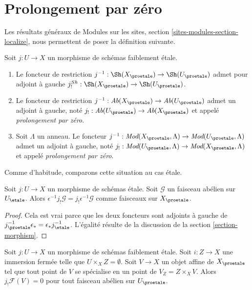 \section{Prolongement par zéro}
\label{section-extension-by-zero}

\noindent
Les résultats généraux de
Modules sur les sites, section \ref{sites-modules-section-localize},
nous permettent de poser la définition suivante.

\begin{definition}
\label{definition-extension-zero}
Soit $j : U \to X$ un morphisme de schémas faiblement \'etale.
\begin{enumerate}
\item Le foncteur de restriction
$j^{-1} : \Sh(X_\proetale) \to \Sh(U_\proetale)$
admet pour adjoint à gauche
$j_!^{Sh} : \Sh(X_\proetale) \to \Sh(U_\proetale)$.
\item Le foncteur de restriction
$j^{-1} : \textit{Ab}(X_\proetale) \to \textit{Ab}(U_\proetale)$
admet un adjoint à gauche, noté
$j_! : \textit{Ab}(U_\proetale) \to \textit{Ab}(X_\proetale)$
et appelé {\it prolongement par zéro}.
\item Soit $\Lambda$ un anneau. Le foncteur
$j^{-1} : \textit{Mod}(X_\proetale, \Lambda) \to
\textit{Mod}(U_\proetale, \Lambda)$
admet un adjoint à gauche, noté
$j_! : \textit{Mod}(U_\proetale, \Lambda) \to
\textit{Mod}(X_\proetale, \Lambda)$
et appelé {\it prolongement par zéro}.
\end{enumerate}
\end{definition}

\noindent
Comme d'habitude, comparons cette situation au cas \'etale.

\begin{lemma}
\label{lemma-jshriek-comparison}
Soit $j : U \to X$ un morphisme de schémas \'etale.
Soit $\mathcal{G}$ un faisceau abélien sur $U_\etale$.
Alors $\epsilon^{-1} j_!\mathcal{G} = j_!\epsilon^{-1}\mathcal{G}$
comme faisceaux sur $X_\proetale$.
\end{lemma}

\begin{proof}
Cela est vrai parce que les deux foncteurs sont adjoints à gauche de
$j_\proetale^{-1} \epsilon_* = \epsilon_* j_\etale^{-1}$.
L'égalité résulte de la discussion de la section \ref{section-morphism}.
\end{proof}

\begin{lemma}
\label{lemma-jshriek-zero}
Soit $j : U \to X$ un morphisme de schémas faiblement \'etale.
Soit $i : Z \to X$ une immersion fermée telle que $U \times_X Z = \emptyset$.
Soit $V \to X$ un objet affine de $X_\proetale$ tel que tout point
de $V$ se spécialise en un point de $V_Z = Z \times_X V$.
Alors $j_!\mathcal{F}(V) = 0$ pour tout faisceau abélien sur $U_\proetale$.
\end{lemma}

